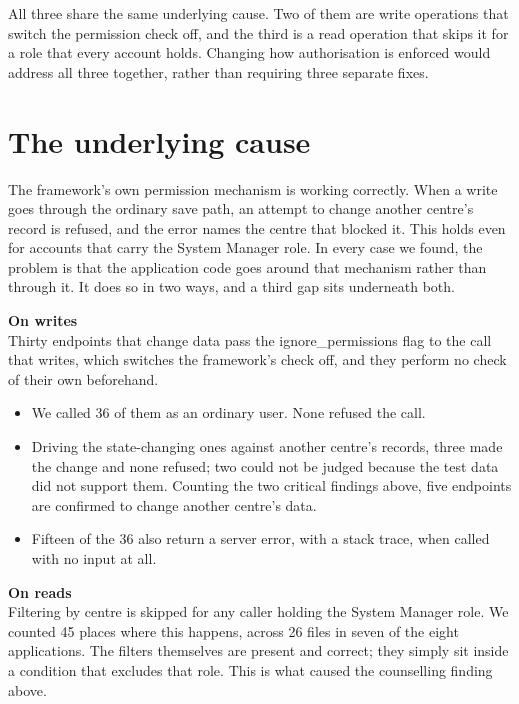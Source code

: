 \documentclass[10pt,a4paper]{article}
\newcommand{\display}{\sffamily}
\newcommand{\code}[1]{{\ttfamily #1}}
\begin{document}
\vspace{0.5em}
All three share the same underlying cause. Two of them are write operations that switch the
permission check off, and the third is a read operation that skips it for a role that every account
holds. Changing how authorisation is enforced would address all three together, rather than
requiring three separate fixes.

\section{The underlying cause}

\begin{minipage}[t]{0.55\textwidth}
\vspace{0pt}
\raggedright
The framework's own permission mechanism is working correctly. When a write goes through the
ordinary save path, an attempt to change another centre's record is refused, and the error names
the centre that blocked it. This holds even for accounts that carry the \code{System Manager} role.
In every case we found, the problem is that the application code goes around that mechanism rather
than through it. It does so in two ways, and a third gap sits underneath both.

\vspace{0.4em}
{\display\small\bfseries\color{accent}On writes}\\[0.15em]
Thirty endpoints that change data pass the \code{ignore\_permissions} flag to the call that writes,
which switches the framework's check off, and they perform no check of their own beforehand.
\begin{itemize}
  \item We called 36 of them as an ordinary user. None refused the call.
  \item Driving the state-changing ones against another centre's records, three made the change and
        none refused; two could not be judged because the test data did not support them. Counting
        the two critical findings above, five endpoints are confirmed to change another centre's
        data.
  \item Fifteen of the 36 also return a server error, with a stack trace, when called with no
        input at all.
\end{itemize}

{\display\small\bfseries\color{accent}On reads}\\[0.15em]
Filtering by centre is skipped for any caller holding the \code{System Manager} role. We counted 45
places where this happens, across 26 files in seven of the eight applications. The filters
themselves are present and correct; they simply sit inside a condition that excludes that role.
This is what caused the counselling finding above.


\end{minipage}
\end{document}
